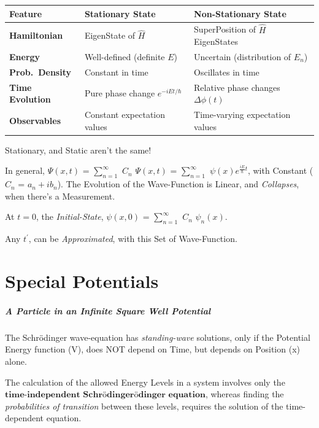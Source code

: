 \documentclass[a4paper, 10pt, onepage]{elegantbook}
\begin{document}
{\begin{table}[ht]
\centering
\begin{tabular}{|l|l|l|}
\hline
\textbf{Feature} & \textbf{Stationary State} & \textbf{Non-Stationary State} \\
\hline
\textbf{Hamiltonian} & EigenState of $\hat{H}$ & SuperPosition of $\hat{H}$ EigenStates \\
\hline
\textbf{Energy} & Well-defined (definite $E$) & Uncertain (distribution of $E_n$) \\
\hline
\textbf{Prob.\ Density} & Constant in time & Oscillates in time \\
\hline
\textbf{Time Evolution} & Pure phase change $e^{-iEt/\hbar}$ & Relative phase changes $\Delta \phi(t)$ \\
\hline
\textbf{Observables} & Constant expectation values & Time-varying expectation values \\
\hline
\end{tabular}
\end{table}

Stationary, and Static aren't the same! 

In general, $\Psi(x,t)$ = $\sum_{n = 1}^\infty$ $C_n$ $\Psi(x,t)$ = $\sum_{n = 1}^\infty$ $\psi(x) e^{\frac{i 
E}{\hbar}t}$, with Constant ($C_n$ = $a_n + i b_n$). The Evolution of the Wave-Function is Linear, and 
\emph{Collapses}, when there's a Measurement.  

At $t = 0$, the \emph{Initial-State}, $\psi(x,0)$ = $\sum_{n = 1}^\infty$ $C_n$ $\psi_{n} (x)$.  

Any $t^{'}$, can be \emph{Approximated}, with this Set of Wave-Function.

\newpage

\chapter{Special Potentials}
\label{ch:Special Potentials}
\paragraph{A Particle in an Infinite Square Well Potential}

\noindent

The Schr\"odinger wave-equation has \emph{standing-wave} solutions, only if the Potential Energy function (V), 
does NOT depend on Time, but depends on Position (x) alone. 

The calculation of the allowed Energy Levels in a system involves only the $\mathbf{\textbf{time-independent 
Schr\"odingerödinger equation}}$, whereas finding the \emph{probabilities of transition} between these levels, requires the 
solution of the time-dependent equation.  

}
\end{document}

